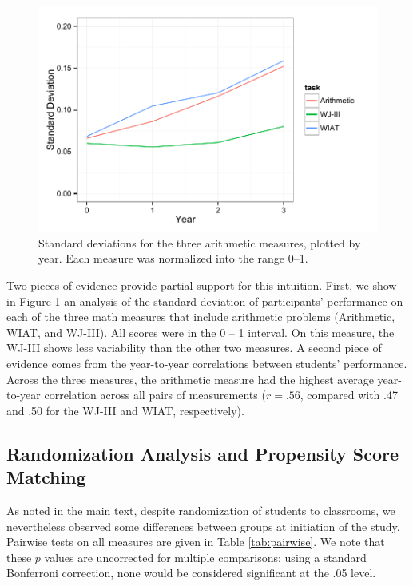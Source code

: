 \documentclass[11pt]{article}
\begin{document}
\begin{figure}[H]
\begin{center}
\includegraphics[width=4.5in]{figures/SDs.pdf}
\end{center}
\caption{Standard deviations for the three arithmetic measures, plotted by year. Each measure was normalized into the range 0--1.}
\label{fig:sds}
\end{figure}

Two pieces of evidence provide partial support for this intuition. First, we show in Figure \ref{fig:sds} an analysis of the standard deviation of participants' performance on each of the three math measures that include arithmetic problems (Arithmetic, WIAT, and WJ-III). All scores were in the 0 -- 1 interval.  On this measure, the WJ-III shows less variability than the other two measures. A second piece of evidence comes from the year-to-year correlations between students' performance. Across the three measures, the arithmetic measure had the highest average year-to-year correlation across all pairs of measurements ($r = .56$, compared with .47 and .50 for the WJ-III and WIAT, respectively).

\subsection{Randomization Analysis and Propensity Score Matching}

As noted in the main text, despite randomization of students to classrooms, we nevertheless observed some differences between groups at initiation of the study. Pairwise tests on all measures are given in Table \ref{tab:pairwise}. We note that these $p$ values are uncorrected for multiple comparisons; using a standard Bonferroni correction, none would be considered significant at the .05 level.
\end{document}
